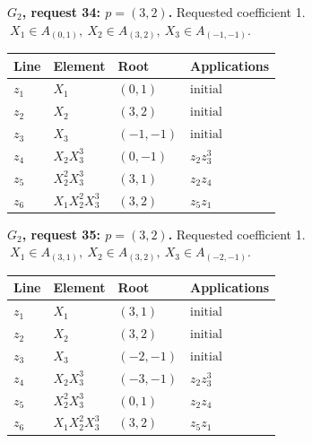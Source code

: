 \par\medskip\noindent\begin{minipage}{\textwidth}
\textbf{\(G_2\), request 34: \(p=(3,2)\).} Requested coefficient 1.
\(\ X_1\in A_{(0,1)},\ X_2\in A_{(3,2)},\ X_3\in A_{(-1,-1)}.\)\par
\smallskip\centering\small\begin{tabular}{@{}llll@{}}\toprule
Line & Element & Root & Applications\\\midrule
\(z_{1}\) & \(X_1\) & \((0,1)\) & \(\text{initial}\) \\
\(z_{2}\) & \(X_2\) & \((3,2)\) & \(\text{initial}\) \\
\(z_{3}\) & \(X_3\) & \((-1,-1)\) & \(\text{initial}\) \\
\(z_{4}\) & \(X_2X_3^{3}\) & \((0,-1)\) & \(z_{2}z_{3}^{3}\) \\
\(z_{5}\) & \(X_2^{2}X_3^{3}\) & \((3,1)\) & \(z_{2}z_{4}\) \\
\(z_{6}\) & \(X_1X_2^{2}X_3^{3}\) & \((3,2)\) & \(z_{5}z_{1}\) \\
\bottomrule\end{tabular}\end{minipage}\par
\par\medskip\noindent\begin{minipage}{\textwidth}
\textbf{\(G_2\), request 35: \(p=(3,2)\).} Requested coefficient 1.
\(\ X_1\in A_{(3,1)},\ X_2\in A_{(3,2)},\ X_3\in A_{(-2,-1)}.\)\par
\smallskip\centering\small\begin{tabular}{@{}llll@{}}\toprule
Line & Element & Root & Applications\\\midrule
\(z_{1}\) & \(X_1\) & \((3,1)\) & \(\text{initial}\) \\
\(z_{2}\) & \(X_2\) & \((3,2)\) & \(\text{initial}\) \\
\(z_{3}\) & \(X_3\) & \((-2,-1)\) & \(\text{initial}\) \\
\(z_{4}\) & \(X_2X_3^{3}\) & \((-3,-1)\) & \(z_{2}z_{3}^{3}\) \\
\(z_{5}\) & \(X_2^{2}X_3^{3}\) & \((0,1)\) & \(z_{2}z_{4}\) \\
\(z_{6}\) & \(X_1X_2^{2}X_3^{3}\) & \((3,2)\) & \(z_{5}z_{1}\) \\
\bottomrule\end{tabular}\end{minipage}\par
